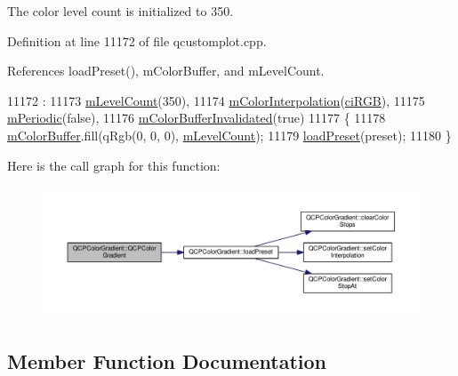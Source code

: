 The color level count is initialized to 350. 

Definition at line 11172 of file qcustomplot.\+cpp.



References load\+Preset(), m\+Color\+Buffer, and m\+Level\+Count.


\begin{DoxyCode}
11172                                                         :
11173   \hyperlink{class_q_c_p_color_gradient_a98fb68e359904b2c991fcae3e38a211a}{mLevelCount}(350),
11174   \hyperlink{class_q_c_p_color_gradient_a028cef73d863800a9ee93ffd641cce01}{mColorInterpolation}(\hyperlink{class_q_c_p_color_gradient_ac5dca17cc24336e6ca176610e7f77fc1a5e30f725c9cfe93999e268a9f92afbe7}{ciRGB}),
11175   \hyperlink{class_q_c_p_color_gradient_a4b07deeb20ca1ee2d5ea7e01bf0420af}{mPeriodic}(\textcolor{keyword}{false}),
11176   \hyperlink{class_q_c_p_color_gradient_abacf55e11f67d6722a687af1bb2687bd}{mColorBufferInvalidated}(\textcolor{keyword}{true})
11177 \{
11178   \hyperlink{class_q_c_p_color_gradient_af8b5f0739faa5f8295154d47ce38ecff}{mColorBuffer}.fill(qRgb(0, 0, 0), \hyperlink{class_q_c_p_color_gradient_a98fb68e359904b2c991fcae3e38a211a}{mLevelCount});
11179   \hyperlink{class_q_c_p_color_gradient_aa0aeec1528241728b9671bf8e60b1622}{loadPreset}(preset);
11180 \}
\end{DoxyCode}


Here is the call graph for this function\+:\nopagebreak
\begin{figure}[H]
\begin{center}
\leavevmode
\includegraphics[width=350pt]{class_q_c_p_color_gradient_a546e44df5fa1846400a582c041361c85_cgraph}
\end{center}
\end{figure}




\subsection{Member Function Documentation}
\hypertarget{class_q_c_p_color_gradient_a939213e85f0d1279519d555c5fcfb6ad}{}
